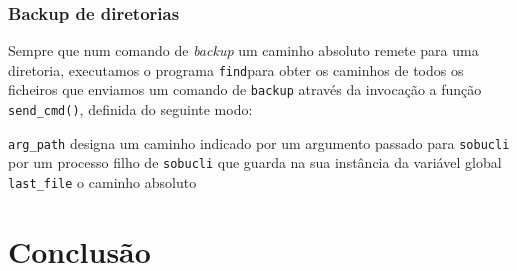 \documentclass[a4paper,12pt,titlepage,draft,portuguese]{article}
\begin{document}
\subsubsection{Backup de diretorias}

Sempre que num comando de \emph{backup} um caminho absoluto remete para uma diretoria, executamos o programa \texttt{find}para obter os caminhos de todos os ficheiros que  enviamos um comando de \texttt{backup} através da invocação a função \texttt{send\_cmd()}, definida do seguinte modo:

	

\texttt{arg_path} designa um caminho indicado por um argumento passado para \texttt{sobucli} por um processo filho de \texttt{sobucli} que guarda na sua instância da variável global \texttt{last_file} o caminho absoluto 

\section{Conclusão}
\end{document}
